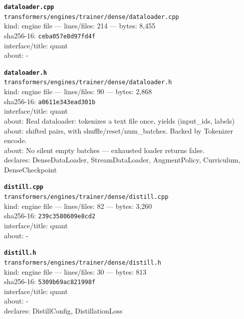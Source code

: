 \noindent\textbf{\texttt{dataloader.cpp}}\\
\texttt{transformers/engines/trainer/dense/dataloader.cpp}\\
kind: engine file --- lines/files: 214 --- bytes: 8,455\\
sha256-16: \texttt{ceba057e8d97fd4f}\\
interface/title: quant\\
about: -\\
\vspace*{6.0pt}

\noindent\textbf{\texttt{dataloader.h}}\\
\texttt{transformers/engines/trainer/dense/dataloader.h}\\
kind: engine file --- lines/files: 90 --- bytes: 2,868\\
sha256-16: \texttt{a0611e343ead301b}\\
interface/title: quant\\
about: Real dataloader: tokenizes a text file once, yields (input\_ids, labels)\\
about: shifted pairs, with shuffle/reset/num\_batches. Backed by Tokenizer encode.\\
about: No silent empty batches — exhausted loader returns false.\\
declares: DenseDataLoader, StreamDataLoader, AugmentPolicy, Curriculum, DenseCheckpoint\\
\vspace*{6.0pt}
\newpage

\noindent\textbf{\texttt{distill.cpp}}\\
\texttt{transformers/engines/trainer/dense/distill.cpp}\\
kind: engine file --- lines/files: 82 --- bytes: 3,260\\
sha256-16: \texttt{239c3580609e8cd2}\\
interface/title: quant\\
about: -\\
\vspace*{6.0pt}

\noindent\textbf{\texttt{distill.h}}\\
\texttt{transformers/engines/trainer/dense/distill.h}\\
kind: engine file --- lines/files: 30 --- bytes: 813\\
sha256-16: \texttt{5309b69ac821998f}\\
interface/title: quant\\
about: -\\
declares: DistillConfig, DistillationLoss\\
\vspace*{6.0pt}

